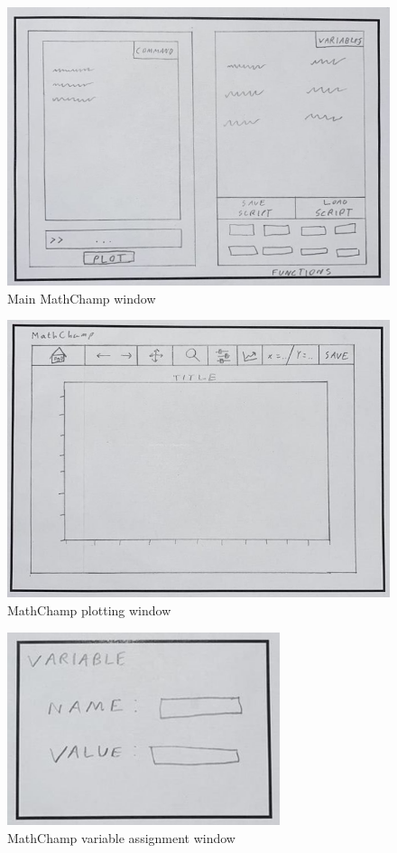 \documentclass[a4paper, oneside, 11pt]{report}
\begin{document}
\begin{figure}[h]
    \centering
    \includegraphics[width=14cm]{LoFiMain.png}
    \caption{Main MathChamp window}
    \label{fig:Lofi-Main}
\end{figure}

\begin{figure}[h]
    \centering
    \includegraphics[width=14cm]{LoFiPlot.png}
    \caption{MathChamp plotting window}
    \label{fig:Lofi-Plotting}
\end{figure}

\begin{figure}[h]
    \centering
    \includegraphics[width=8cm]{LoFiVariable.png}
    \caption{MathChamp variable assignment window}
    \label{fig:Lofi-VariableAssignment}
\end{figure}
\end{document}

